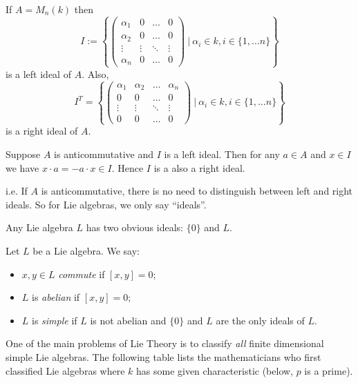 \begin{example}
	If $A = M_n(k)$ then
	\[
		I := \left\{
		\begin{pmatrix}
			\alpha_1 & 0 & \ldots & 0 \\
			\alpha_2 & 0 & \ldots & 0 \\
			\vdots	 & \vdots & \ddots & \vdots \\
			\alpha_n & 0 & \ldots & 0
		\end{pmatrix}
		\ |\ \alpha_i \in k, i \in \{1, \ldots n\}
		\right\}
	\]
	is a left ideal of $A$. Also,
	\[
		I^T = \left\{
		\begin{pmatrix}
			\alpha_1 & \alpha_2 & \ldots & \alpha_n \\
			0 & 0 & \ldots & 0 \\
			\vdots	 & \vdots & \ddots & \vdots \\
			0 & 0 & \ldots & 0
		\end{pmatrix}
		\ |\ \alpha_i \in k, i \in \{1, \ldots n\}
		\right\}
	\]
	is a right ideal of $A$.
\end{example}

\begin{remark}
	Suppose $A$ is anticommutative and $I$ is a left ideal. Then for any $a \in A$ and $x \in I$ we have $x \cdot a = - a \cdot x \in I$. Hence $I$ is a also a right ideal.
	
	i.e. If $A$ is anticommutative, there is no need to distinguish between left and right ideals. So for Lie algebras, we only say ``ideals''.
	
	Any Lie algebra $L$ has two obvious ideals: $\{0\}$ and $L$.
\end{remark}

\begin{definition}
	Let $L$ be a Lie algebra. We say:
	\begin{itemize}
		\item $x, y \in L$ \emph{commute} if $[x, y] = 0$;
		\item $L$ is \emph{abelian} if $[x, y] = 0$;
		\item $L$ is \emph{simple} if $L$ is not abelian and $\{0\}$ and $L$ are the only ideals of $L$.
	\end{itemize}
\end{definition}

One of the main problems of Lie Theory is to classify \emph{all} finite dimensional simple Lie algebras. The following table lists the mathematicians who first classified Lie algebras where $k$ has some given characteristic (below, $p$ is a prime).

